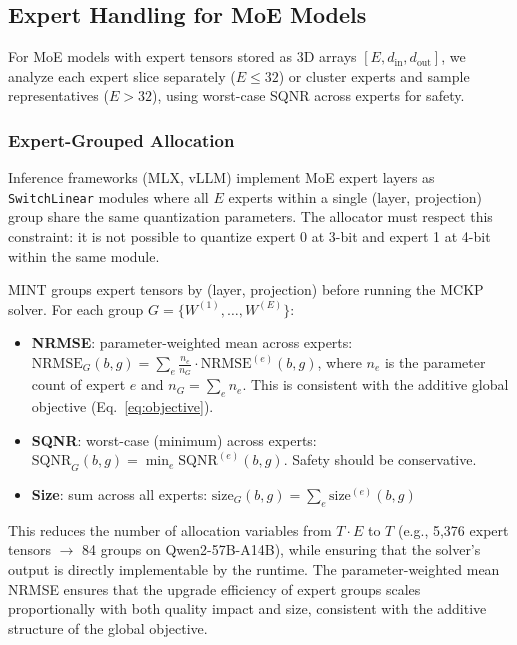 \documentclass{article}
\begin{document}
\subsection{Expert Handling for MoE Models}

For MoE models with expert tensors stored as 3D arrays $[E, d_{\text{in}}, d_{\text{out}}]$, we analyze each expert slice separately ($E \leq 32$) or cluster experts and sample representatives ($E > 32$), using worst-case SQNR across experts for safety.

\subsubsection{Expert-Grouped Allocation}

Inference frameworks (MLX, vLLM) implement MoE expert layers as \texttt{SwitchLinear} modules where all $E$ experts within a single (layer, projection) group share the same quantization parameters. The allocator must respect this constraint: it is not possible to quantize expert 0 at 3-bit and expert 1 at 4-bit within the same module.

MINT groups expert tensors by (layer, projection) before running the MCKP solver. For each group $G = \{W^{(1)}, \ldots, W^{(E)}\}$:
\begin{itemize}
    \item \textbf{NRMSE}: parameter-weighted mean across experts: $\text{NRMSE}_G(b,g) = \sum_e \frac{n_e}{n_G} \cdot \text{NRMSE}^{(e)}(b,g)$, where $n_e$ is the parameter count of expert $e$ and $n_G = \sum_e n_e$. This is consistent with the additive global objective (Eq.~\ref{eq:objective}).
    \item \textbf{SQNR}: worst-case (minimum) across experts: $\text{SQNR}_G(b,g) = \min_e \text{SQNR}^{(e)}(b,g)$. Safety should be conservative.
    \item \textbf{Size}: sum across all experts: $\text{size}_G(b,g) = \sum_e \text{size}^{(e)}(b,g)$
\end{itemize}
This reduces the number of allocation variables from $T \cdot E$ to $T$ (e.g., 5{,}376 expert tensors $\rightarrow$ 84 groups on Qwen2-57B-A14B), while ensuring that the solver's output is directly implementable by the runtime. The parameter-weighted mean NRMSE ensures that the upgrade efficiency of expert groups scales proportionally with both quality impact and size, consistent with the additive structure of the global objective.

\end{document}
